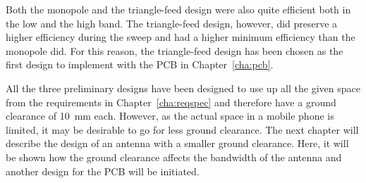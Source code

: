 Both the monopole and the triangle-feed design were also quite efficient both in the low and the high band. The triangle-feed design, however, did preserve a higher efficiency during the sweep and had a higher minimum efficiency than the monopole did. For this reason, the triangle-feed design has been chosen as the first design to implement with the PCB in Chapter~\ref{cha:pcb}.

All the three preliminary designs have been designed to use up all the given space from the requirements in Chapter~\ref{cha:reqspec} and therefore have a ground clearance of \SI{10}{mm} each. However, as the actual space in a mobile phone is limited, it may be desirable to go for less ground clearance. The next chapter will describe the design of an antenna with a smaller ground clearance. Here, it will be shown how the ground clearance affects the bandwidth of the antenna and another design for the PCB will be initiated.

